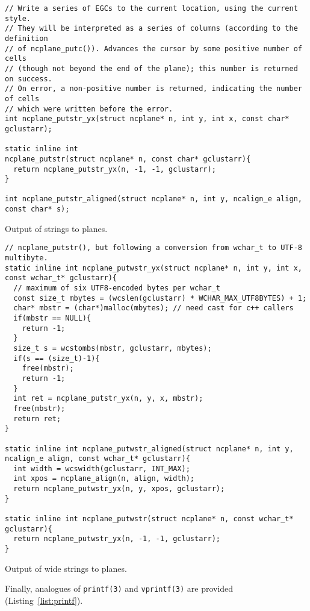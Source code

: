 \begin{listing}[!htbp]
\begin{verbatim}
// Write a series of EGCs to the current location, using the current style.
// They will be interpreted as a series of columns (according to the definition
// of ncplane_putc()). Advances the cursor by some positive number of cells
// (though not beyond the end of the plane); this number is returned on success.
// On error, a non-positive number is returned, indicating the number of cells
// which were written before the error.
int ncplane_putstr_yx(struct ncplane* n, int y, int x, const char* gclustarr);

static inline int
ncplane_putstr(struct ncplane* n, const char* gclustarr){
  return ncplane_putstr_yx(n, -1, -1, gclustarr);
}

int ncplane_putstr_aligned(struct ncplane* n, int y, ncalign_e align, const char* s);
\end{verbatim}
\caption{Output of strings to planes.}
\label{list:putstr}
\end{listing}

\begin{listing}[!htbp]
\begin{verbatim}
// ncplane_putstr(), but following a conversion from wchar_t to UTF-8 multibyte.
static inline int ncplane_putwstr_yx(struct ncplane* n, int y, int x, const wchar_t* gclustarr){
  // maximum of six UTF8-encoded bytes per wchar_t
  const size_t mbytes = (wcslen(gclustarr) * WCHAR_MAX_UTF8BYTES) + 1;
  char* mbstr = (char*)malloc(mbytes); // need cast for c++ callers
  if(mbstr == NULL){
    return -1;
  }
  size_t s = wcstombs(mbstr, gclustarr, mbytes);
  if(s == (size_t)-1){
    free(mbstr);
    return -1;
  }
  int ret = ncplane_putstr_yx(n, y, x, mbstr);
  free(mbstr);
  return ret;
}

static inline int ncplane_putwstr_aligned(struct ncplane* n, int y, ncalign_e align, const wchar_t* gclustarr){
  int width = wcswidth(gclustarr, INT_MAX);
  int xpos = ncplane_align(n, align, width);
  return ncplane_putwstr_yx(n, y, xpos, gclustarr);
}

static inline int ncplane_putwstr(struct ncplane* n, const wchar_t* gclustarr){
  return ncplane_putwstr_yx(n, -1, -1, gclustarr);
}
\end{verbatim}
\caption{Output of wide strings to planes.}
\label{list:wputstr}
\end{listing}

Finally, analogues of \texttt{printf(3)} and \texttt{vprintf(3)} are provided (Listing~\ref{list:printf}).

